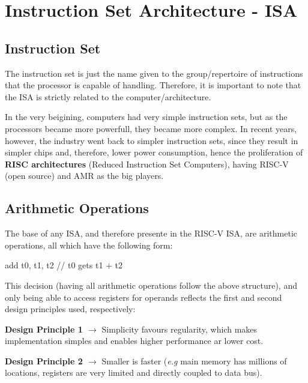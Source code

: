 \documentclass{article}
\begin{document}
\section{Instruction Set Architecture - ISA}
\subsection{Instruction Set}
The instruction set is just the name given to the group/repertoire of instructions that the processor is capable of handling. Therefore, it is important to note that the ISA is strictly related to the computer/architecture. 

In the very beigining, computers had very simple instruction sets, but as the processors became more powerfull, they became more complex. In recent years, however, the industry went back to simpler instruction sets, since they result in simpler chips and, therefore, lower power consumption, hence the proliferation of \textbf{RISC architectures} (Reduced Instruction Set Computers), having RISC-V (open source) and AMR as the big players.

\subsection{Arithmetic Operations}
The base of any ISA, and therefore presente in the RISC-V ISA, are arithmetic operations, all which have the following form:

\begin{center}
    add t0, t1, t2 // t0 gets t1 + t2
\end{center}

This decision (having all arithmetic operations follow the above structure), and only being able to access registers for operands reflects the first and second design principles used, respectively:

\textbf{Design Principle 1 $\rightarrow$} Simplicity favours regularity, which makes implementation simples and enables higher performance ar lower cost.

\textbf{Design Principle 2 $\rightarrow$} Smaller is faster (\emph{e.g} main memory has millions of locations, registers are very limited and directly coupled to data bus).
\end{document}
